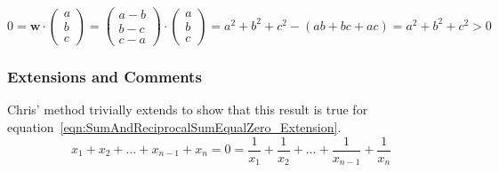 \begin{equation}
	0 = \mathbf{w} \cdot \left( \begin{array}{c} a\\ b\\ c \end{array} \right) = \left( \begin{array}{c} a - b \\ b - c \\ c - a \end{array} \right) \cdot \left( \begin{array}{c} a\\ b\\ c \end{array} \right) = a^2 + b^2 + c^2 - (ab + bc + ac) = a^2 + b^2 + c^2 > 0
\end{equation}

\subsubsection{Extensions and Comments}

Chris' method trivially extends to show that this result is true for equation~\eqref{eqn:SumAndReciprocalSumEqualZero_Extension}.
\begin{equation}
	x_1 + x_2 + \dots + x_{n-1} + x_n = 0 = \frac{1}{x_1} + \frac{1}{x_2} + \dots + \frac{1}{x_{n-1}} + \frac{1}{x_n}
	\label{eqn:SumAndReciprocalSumEqualZero_Extension}
\end{equation}
